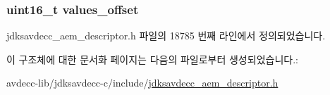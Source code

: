 \subsubsection[{\texorpdfstring{values\+\_\+offset}{values_offset}}]{\setlength{\rightskip}{0pt plus 5cm}uint16\+\_\+t values\+\_\+offset}\hypertarget{structjdksavdecc__descriptor__control_a2987071ee0b81f35817e48a0dc92ad76}{}\label{structjdksavdecc__descriptor__control_a2987071ee0b81f35817e48a0dc92ad76}


jdksavdecc\+\_\+aem\+\_\+descriptor.\+h 파일의 18785 번째 라인에서 정의되었습니다.



이 구조체에 대한 문서화 페이지는 다음의 파일로부터 생성되었습니다.\+:\begin{DoxyCompactItemize}
\item 
avdecc-\/lib/jdksavdecc-\/c/include/\hyperlink{jdksavdecc__aem__descriptor_8h}{jdksavdecc\+\_\+aem\+\_\+descriptor.\+h}\end{DoxyCompactItemize}
